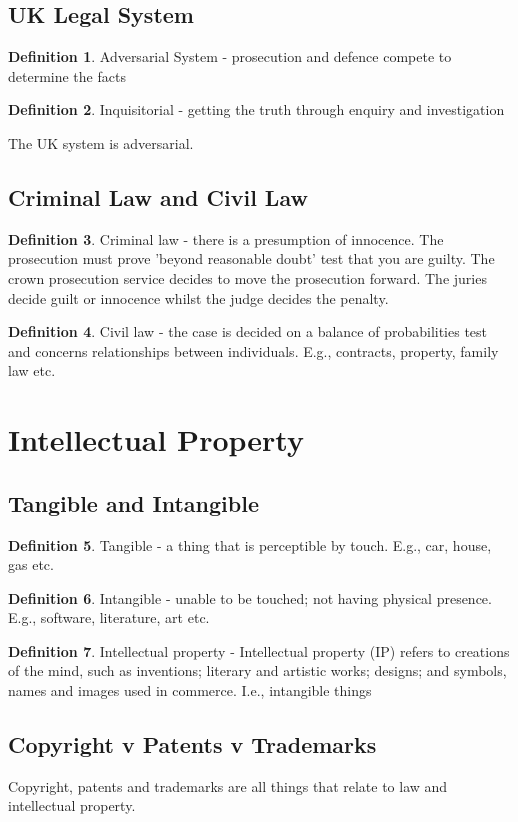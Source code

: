\documentclass[a4paper]{article}
\theoremstyle{plain}
\theoremstyle{definition}
\newtheorem{defn}{Definition}[section]
\theoremstyle{remark}
\begin{document}
\subsection{UK Legal System}
\begin{defn}
	Adversarial System - prosecution and defence compete to determine the facts
\end{defn}
\begin{defn}
	Inquisitorial - getting the truth through enquiry and investigation
\end{defn}
The UK system is adversarial.
\subsection{Criminal Law and Civil Law}
\begin{defn}
	Criminal law - there is a presumption of innocence. The prosecution must prove 'beyond reasonable doubt' test that you are guilty. The crown prosecution service decides to move the prosecution forward. The juries decide guilt or innocence whilst the judge decides the penalty.
\end{defn}
\begin{defn}
	Civil law - the case is decided on a balance of probabilities test and concerns relationships between individuals. E.g., contracts, property, family law etc.
\end{defn}
\section{Intellectual Property}
\subsection{Tangible and Intangible}
\begin{defn}
	Tangible - a thing that is perceptible by touch. E.g., car, house, gas etc.
\end{defn}
\begin{defn}
	Intangible - unable to be touched; not having physical presence. E.g., software, literature, art etc.
\end{defn}
\begin{defn}
	Intellectual property - Intellectual property (IP) refers to creations of the mind, such as inventions; literary and artistic works; designs; and symbols, names and images used in commerce. I.e., intangible things
\end{defn}
\subsection{Copyright v Patents v Trademarks}
Copyright, patents and trademarks are all things that relate to law and intellectual property. 
\end{document}
